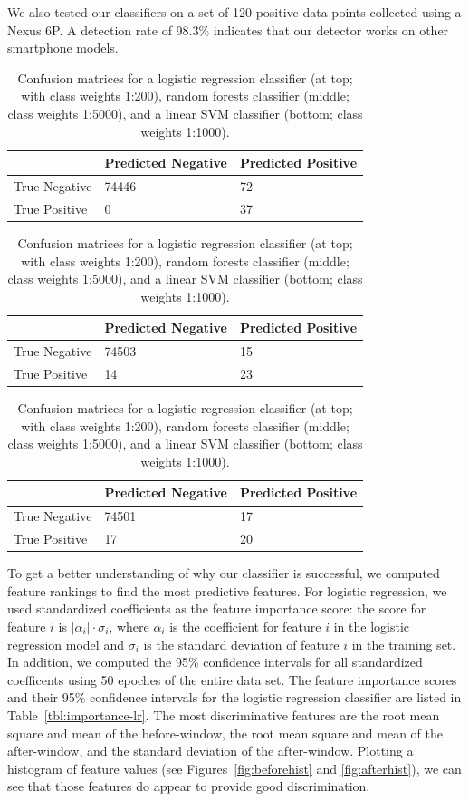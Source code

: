 We also tested our classifiers on a set of 120 positive data points collected using a Nexus 6P. A detection rate of 98.3\% indicates that our detector works on other smartphone models.

\begin{table}[t]
\caption{Confusion matrices for a logistic regression classifier (at top; with class weights 1:200), random forests classifier (middle; class weights 1:5000), and a linear SVM classifier (bottom; class weights 1:1000).}
\centering
\begin{tabular}{@{}lll@{}}
\toprule
              & Predicted Negative & Predicted Positive \\ \midrule
True Negative & 74446              & 72                 \\
True Positive & 0                  & 37                 \\ \bottomrule
\end{tabular}

\begin{tabular}{@{}lll@{}}
\toprule
              & Predicted Negative & Predicted Positive \\ \midrule
True Negative & 74503              & 15                 \\
True Positive & 14                 & 23                 \\ \bottomrule
\end{tabular}

\begin{tabular}{@{}lll@{}}
\toprule
              & Predicted Negative & Predicted Positive \\ \midrule
True Negative & 74501              & 17               \\
True Positive & 17                 & 20                 \\ \bottomrule
\end{tabular}
\label{fig:cmat}
\end{table}


To get a better understanding of why our classifier is successful,
we computed feature rankings to find the most predictive features.
For logistic regression, we used standardized coefficients as the feature importance score:
the score for feature $i$ is $|\alpha_i| \cdot \sigma_i$, where $\alpha_i$ is the coefficient for feature $i$ in the logistic regression model and $\sigma_i$ is the standard deviation of feature $i$ in the training set.
In addition, we computed the 95\% confidence intervals for all standardized coefficents using 50 epoches of the entire data set.
The feature importance scores and their 95\% confidence intervals for the logistic regression classifier are listed in Table~\ref{tbl:importance-lr}.
The most discriminative features are
the root mean square and mean of the before-window,
the root mean square and mean of the after-window,
and the standard deviation of the after-window.
Plotting a histogram of feature values (see Figures~\ref{fig:beforehist} and \ref{fig:afterhist}), we can see that those features do appear to provide good discrimination.


